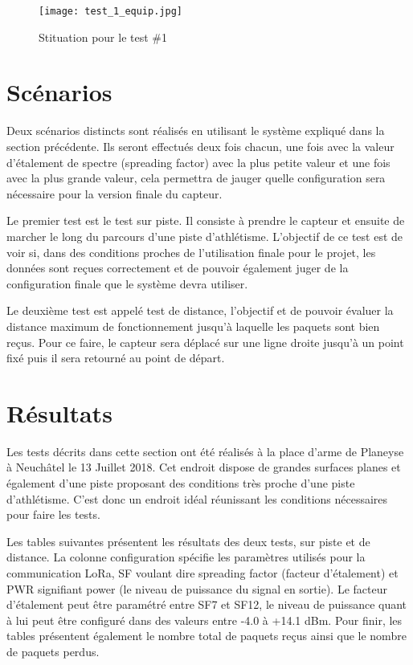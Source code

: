 \begin{figure}[htb]
\centering 
\texttt{[image: test\_1\_equip.jpg]} 
\caption{Stituation pour le test \#1}
\label{fig:situation_test_1}
\end{figure}

\section{Scénarios}

Deux scénarios distincts sont réalisés en utilisant le système expliqué dans la section précédente. Ils seront effectués deux fois chacun, une fois avec la valeur d'étalement de spectre (spreading factor) avec la plus petite valeur et une fois avec la plus grande valeur, cela permettra de jauger quelle configuration sera nécessaire pour la version finale du capteur.

Le premier test est le test sur piste. Il consiste à prendre le capteur et ensuite de marcher le long du parcours d'une piste d'athlétisme. L'objectif de ce test est de voir si, dans des conditions proches de l'utilisation finale pour le projet, les données sont reçues correctement et de pouvoir également juger de la configuration finale que le système devra utiliser.

Le deuxième test est appelé test de distance, l'objectif et de pouvoir évaluer la distance maximum de fonctionnement jusqu'à laquelle les paquets sont bien reçus. Pour ce faire, le capteur sera déplacé sur une ligne droite jusqu'à un point fixé puis il sera retourné au point de départ.

\section{Résultats}

Les tests décrits dans cette section ont été réalisés à la place d'arme de Planeyse à Neuchâtel le 13 Juillet 2018. Cet endroit dispose de grandes surfaces planes et également d'une piste proposant des conditions très proche d'une piste d'athlétisme. C'est donc un endroit idéal réunissant les conditions nécessaires pour faire les tests.

Les  tables suivantes présentent les résultats des deux tests, sur piste et de distance. La colonne configuration spécifie les paramètres utilisés pour la communication LoRa, SF voulant dire spreading factor (facteur d'étalement) et PWR signifiant power (le niveau de puissance du signal en sortie).  Le facteur d'étalement peut être paramétré entre SF7 et SF12, le niveau de puissance quant à lui peut être configuré dans des valeurs entre -4.0 à +14.1 dBm.
Pour finir, les tables présentent également le nombre total de paquets reçus ainsi que le nombre de paquets perdus.


